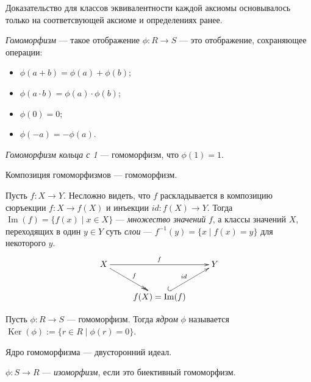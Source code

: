 \documentclass[12pt,a4paper]{article}
\DeclareMathOperator{\Img}{Im}
\DeclareMathOperator{\Ker}{Ker}
\begin{document}
    \begin{remark}
        Доказательство для классов эквивалентности каждой аксиомы основывалось только на соответсвующей аксиоме и определениях ранее.
    \end{remark}

    \begin{definition}
        \emph{Гомоморфизм} --- такое отображение $\phi: R \to S$ --- это отображение, сохраняющее операции:
        \begin{itemize}
            \item $\phi(a + b) = \phi(a) + \phi(b)$;
            \item $\phi(a \cdot b) = \phi(a) \cdot \phi(b)$;
            \item $\phi(0) = 0$;
            \item $\phi(-a) = -\phi(a)$.
        \end{itemize}

        \emph{Гомоморфизм кольца с 1} --- гомоморфизм, что $\phi(1) = 1$.
    \end{definition}

    \begin{statement}
        Композиция гомоморфизмов --- гомоморфизм.
    \end{statement}

    \begin{definition}
        Пусть $f: X \to Y$. Несложно видеть, что $f$ раскладывается в композицию сюръекции $f: X \to f(X)$ и инъекции $id: f(X) \to Y$. Тогда $\Img(f) = \{f(x) \mid x \in X\}$ --- \emph{множество значений} $f$, а классы значений $X$, переходящих в один $y\in Y$ суть \emph{слои} --- $f^{-1}(y) = \{x \mid f(x) = y\}$ для некоторого $y$.
        \[
            \xymatrix{
                X \ar@{->>}[rd]^f \ar[rr]^f && Y\\
                & f(X) = \Img(f) \ar@{^{(}->}[ur]^{id}
            }
        \]
    \end{definition}

    \begin{definition}
        Пусть $\phi: R \to S$ --- гомоморфизм. Тогда \emph{ядром} $\phi$ называется $\Ker(\phi) := \{r \in R \mid \phi(r) = 0\}$.
    \end{definition}

    \begin{statement}
        Ядро гомоморфизма --- двусторонний идеал.
    \end{statement}

    \begin{definition}
        $\phi: S \to R$ --- \emph{изоморфизм}, если это биективный гомоморфизм.
    \end{definition}
\end{document}

